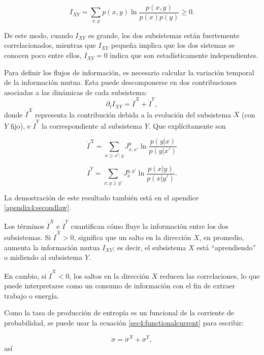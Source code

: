 \begin{equation*}
    I_{XY} = \sum_{x,y} p(x,y) \ln \frac{p(x,y)}{p(x)p(y)} \geq 0. 
\end{equation*}

De este modo, cuando \( I_{XY} \) es grande, los dos subsistemas están fuertemente correlacionados, mientras que $I_{XY}$ pequeña implica que los dos sistemas se conocen poco entre ellos, \( I_{XY} = 0 \) indica que son estadísticamente independientes.

Para definir los flujos de información, es necesario calcular la variación temporal de la información mutua. Esta puede descomponerse en dos contribuciones asociadas a las dinámicas de cada subsistema:
\[
\partial_t I_{XY} = \dot{I}^{X} + \dot{I}^{Y},
\]
donde \( \dot{I}^{X} \) representa la contribución debida a la evolución del subsistema \( X \) (con \( Y \) fijo), e \( \dot{I}^{Y} \) la correspondiente al subsistema \( Y \). Que explícitamente son

\begin{equation}
    \dot{I}^{X}  = \sum_{x\geq x'; y}J_{x,x'}^{y} \ln \frac{ p(y|x) }{p(y|x')}
    \label{sec4:clasicalflows0}
\end{equation}

\begin{equation}    
    \dot{I}^{Y}  = \sum_{x;y\geq y'} J_{x}^{y,y'} \ln \frac{p(x|y)}{ p(x|y') }.
    \label{sec4:clasicalflows}
\end{equation}

 La demostración de este resultado también está en el apendice \ref{apendix4:secondlaw}.

Los términos \( \dot{I}^{X} \) e \( \dot{I}^{Y} \) cuantifican cómo fluye la información entre los dos subsistemas. Si \( \dot{I}^{X} > 0 \), significa que un salto en la dirección \( X \), en promedio, aumenta la información mutua \( I_{XY} \); es decir, el subsistema \( X \) está ``aprendiendo'' o midiendo al subsistema \( Y \).

En cambio, si \( \dot{I}^{X} < 0 \), los saltos en la dirección \( X \) reducen las correlaciones, lo que puede interpretarse como un consumo de información con el fin de extraer trabajo o energía.

Como la tasa de producción de entropía es un funcional de la corriente de probabilidad, se puede usar la ecuación \ref{sec4:functionalcurrent} para escribir:


 \begin{equation*}
    \dot{\sigma} = \dot{\sigma}^{X} + \dot{\sigma}^{Y},
 \end{equation*}
así

